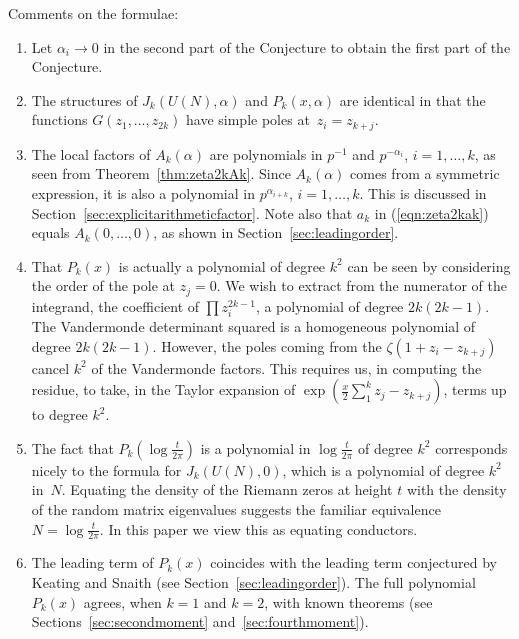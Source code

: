 \documentclass[12pt,letterpaper]{amsart}
\theoremstyle{plain}
\theoremstyle{definition}
\theoremstyle{remark}
\numberwithin{equation}{subsection}
\numberwithin{theorem}{subsection}
\numberwithin{table}{subsection}
\begin{document}
Comments on the formulae:
\begin{enumerate}

\item Let $\alpha_i\to0$ in the second part of the Conjecture to obtain
the first part of the Conjecture.

\item 
The structures of $J_k(U(N),\alpha)$ and $P_k(x,\alpha)$ are identical
in that the functions $G(z_1,\dots,z_{2k})$ have simple poles 
at~$z_i=z_{k+j}$.

\item The local factors of $A_k(\alpha)$ are polynomials
in $p^{-1}$ and $p^{-\alpha_i}$, $i=1,\ldots,k$, as seen from
Theorem~\ref{thm:zeta2kAk}. Since $A_k(\alpha)$ comes from a symmetric
expression, it is also a polynomial in $p^{\alpha_{i+k}}$,
$i=1,\ldots,k$. This is discussed in Section~\ref{sec:explicitarithmeticfactor}.  Note also that
$a_k$ in (\ref{eqn:zeta2kak}) equals $A_k(0,\ldots,0)$,
as shown in Section~\ref{sec:leadingorder}.

\item That $P_k(x)$ is actually a polynomial of degree $k^2$
can be seen by considering the order of the pole at $z_j=0$. We wish to extract
from the numerator of the integrand, the coefficient of $\prod z_i^{2k-1}$, a polynomial
of degree $2k(2k-1)$.
The Vandermonde determinant squared is a homogeneous polynomial of degree
$2k(2k-1)$. However, the poles coming from the $\zeta(1+z_i-z_{k+j})$
cancel $k^2$ of the Vandermonde factors. This requires us, in computing the residue,
to take, in the Taylor expansion of $\exp(\frac{x}{2}\sum_1^k z_j-z_{k+j})$, terms up
to degree $k^2$.

\item The fact that $P_k(\log\tfrac{t}{2\pi})$ is a polynomial in $\log\tfrac{t}
{2\pi}$ of degree $k^2$ corresponds nicely to the formula for
$J_k(U(N),0)$, which is a polynomial of degree $k^2$ in~$N$.
Equating the density of the Riemann zeros at height $t$ with the
density of the random matrix eigenvalues suggests the familiar equivalence
$N=\log\tfrac{t}{2\pi}$.  In this paper we view this as equating conductors.

\item The leading term of
$P_k(x)$ coincides with the leading term conjectured by Keating
and Snaith (see Section~\ref{sec:leadingorder}).
The full polynomial $P_k(x)$ agrees,
when $k=1$ and $k=2$, with known theorems (see Sections~\ref{sec:secondmoment}
and~\ref{sec:fourthmoment}).


\end{enumerate}
\end{document}
